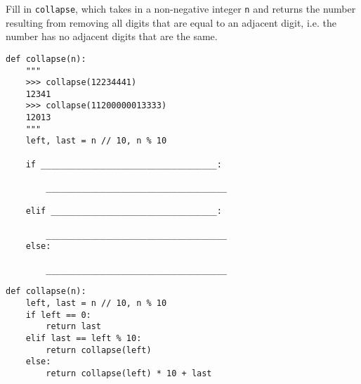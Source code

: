 \begin{blocksection}
\question
Fill in \lstinline{collapse}, which takes in a non-negative integer \lstinline{n} and returns the number resulting from removing all digits that are equal to an adjacent digit, i.e. the number has no adjacent digits that are the same.

\begin{lstlisting}
def collapse(n):
    """
    >>> collapse(12234441)
    12341
    >>> collapse(11200000013333)
    12013
    """
    left, last = n // 10, n % 10

    if ___________________________________:

        ____________________________________

    elif _________________________________:

        ____________________________________
    else:

        ____________________________________
\end{lstlisting}
\end{blocksection}

\begin{blocksection}
\begin{solution}
\begin{lstlisting}
def collapse(n):
    left, last = n // 10, n % 10
    if left == 0:
        return last
    elif last == left % 10:
        return collapse(left)
    else:
        return collapse(left) * 10 + last
\end{lstlisting}
\end{solution}
\end{blocksection}


